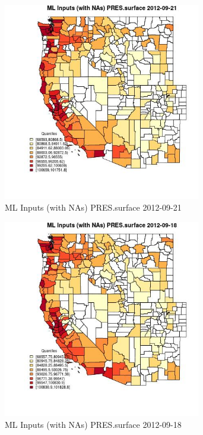 \begin{figure} 
\centering  
\includegraphics[width=0.77\textwidth]{Code_Outputs/Report_ML_input_PM25_Step4_part_e_de_duplicated_aves_compiled_2019-05-14wNAs_CountyPRESsurfaceMean2012-09-21_2012-09-21.jpg} 
\caption{\label{fig:Report_ML_input_PM25_Step4_part_e_de_duplicated_aves_compiled_2019-05-14wNAsCountyPRESsurfaceMean2012-09-21_2012-09-21}ML Inputs (with NAs) PRES.surface 2012-09-21} 
\end{figure} 
 

\begin{figure} 
\centering  
\includegraphics[width=0.77\textwidth]{Code_Outputs/Report_ML_input_PM25_Step4_part_e_de_duplicated_aves_compiled_2019-05-14wNAs_CountyPRESsurfaceMean2012-09-18_2012-09-18.jpg} 
\caption{\label{fig:Report_ML_input_PM25_Step4_part_e_de_duplicated_aves_compiled_2019-05-14wNAsCountyPRESsurfaceMean2012-09-18_2012-09-18}ML Inputs (with NAs) PRES.surface 2012-09-18} 
\end{figure} 
 

